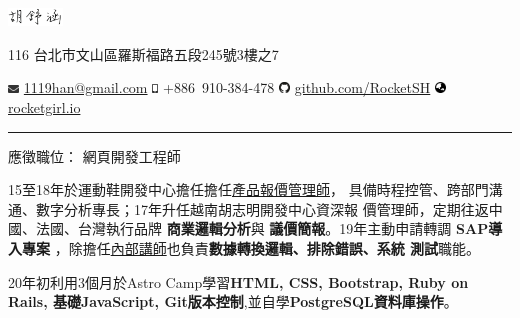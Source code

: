 \documentclass[a4paper,10pt]{article}
\begin{document}
\frenchspacing

\begin{center} 
  \Huge{\includegraphics[height=1.3em,trim=0 10mm 0 -1cm]{shared/signature.png}}\par
  \normalsize {116 台北市文山區羅斯福路五段245號3樓之7}

  \includegraphics[width=0.8em]{shared/envelope.eps}
  \href{mailto:1119han@gmail.com}{1119han@gmail.com} \md
  \includegraphics[height=0.7em]{shared/mobile-alt.eps} +886~910-384-478 \md
  \includegraphics[width=0.8em]{shared/github.eps}
  \href{https://github.com/RocketSH}{github.com/RocketSH} \md
  \includegraphics[width=0.8em]{shared/globe-asia.eps} \href{https://rocketgirl.io/}{rocketgirl.io}
\end{center}

\rule{15.2cm}{0.05em}

\vspace*{1em}
\begin{center}
  \large{應徵職位： 網頁開發工程師}
\end{center}
\vspace*{1em}

\begin{center}
  \begin{minipage}{0.9\textwidth}
    15至18年於運動鞋開發中心擔任擔任\underline{產品報價管理師}，
        具備時程控管、跨部門溝通、數字分析專長；17年升任越南胡志明開發中心資深報
        價管理師，定期往返中國、法國、台灣執行品牌 \textbf{商業邏輯分析}與
        \textbf{議價簡報}。19年主動申請轉調 \textbf{SAP導入專案}
        ，除擔任\underline{內部講師}也負責\textbf{數據轉換邏輯、排除錯誤、系統
          測試}職能。

        \vspace*{1em}
        20年初利用3個月於Astro Camp學習\textbf{HTML, CSS, Bootstrap, Ruby on
          Rails, 基礎JavaScript, Git版本控制},並自學\textbf{PostgreSQL資料庫操作}。
  \end{minipage}
\end{center}
\end{document}
